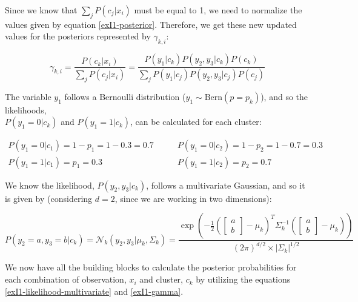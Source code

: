\documentclass[12pt]{article}
\begin{document}
\begin{enumerate}[leftmargin=\labelsep]
          Since we know that $\sum_j P(c_j|x_i)$ must be equal to 1, we need to normalize the values given by equation \eqref{exI1-posterior}.
          Therefore, we get these new updated values for the posteriors represented by $\gamma_{k,i}$:

          \begin{equation}\label{exI1-gamma}
              \gamma_{k,i} = \frac{P(c_k | x_i)}{\sum_j P(c_j | x_i)}
                           = \frac{P(y_1|c_k)P(y_2,y_3|c_k)P(c_k)}{\sum_j P(y_1|c_j)P(y_2,y_3|c_j)P(c_j)}
          \end{equation}

          The variable $y_1$ follows a Bernoulli distribution ($y_1 \sim \text{Bern}\left(p=p_k\right)$), and so the likelihoods,\\
          $P(y_1=0|c_k)$ and $P(y_1=1|c_k)$, can be calculated for each cluster:

          \vskip -0.2cm
          \begin{align*}
              P(y_1 = 0 | c_1) = 1 - p_1 = 1 - 0.3 = 0.7 & \qquad P(y_1 = 0 | c_2) = 1 - p_2 = 1 - 0.7 = 0.3 \\
              P(y_1 = 1 | c_1) = p_1 = 0.3               & \qquad P(y_1 = 1 | c_2) = p_2 = 0.7
          \end{align*}

          We know the likelihood, $P(y_2,y_3|c_k)$, follows a multivariate Gaussian, and so it is given by
          (considering $d = 2$, since we are working in two dimensions):

          \vskip -0.2cm
          \begin{equation}\label{exI1-likelihood-multivariate}
              P(y_2=a,y_3=b|c_k) = \mathcal{N}_k(y_2,y_3|\mu_k, \Sigma_k)
              = \frac{
              \exp\left(-\frac{1}{2} \left(\begin{bmatrix} a \\ b \end{bmatrix} - \mu_k\right)^T
              \Sigma_k^{-1} \left(\begin{bmatrix} a \\ b \end{bmatrix} - \mu_k\right)\right)}{(2\pi)^{d/2} \times |\Sigma_k|^{1/2}}
          \end{equation}

          We now have all the building blocks to calculate the posterior probabilities
          for each combination of observation, $x_i$ and cluster, $c_k$ by utilizing the equations \eqref{exI1-likelihood-multivariate} and \eqref{exI1-gamma}.


\end{enumerate}
\end{document}
